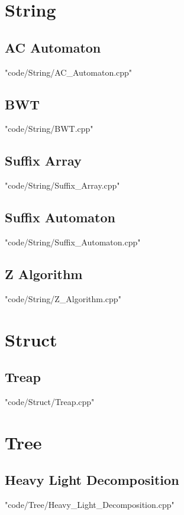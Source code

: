 \documentclass [landscape,8pt,a4paper,twocolumn]{article}
\begin{document}
\section{String}
\subsection{AC Automaton}
 {"code/String/AC_Automaton.cpp"}
\subsection{BWT}
 {"code/String/BWT.cpp"}
\subsection{Suffix Array}
 {"code/String/Suffix_Array.cpp"}
\subsection{Suffix Automaton}
 {"code/String/Suffix_Automaton.cpp"}
\subsection{Z Algorithm}
 {"code/String/Z_Algorithm.cpp"}
\section{Struct}
\subsection{Treap}
 {"code/Struct/Treap.cpp"}
\section{Tree}
\subsection{Heavy Light Decomposition}
 {"code/Tree/Heavy_Light_Decomposition.cpp"}
\end{document}
